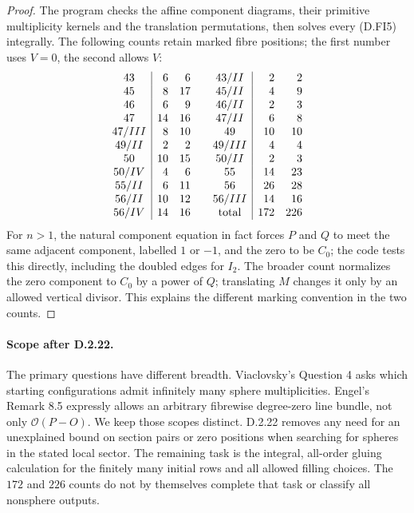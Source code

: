\begin{proof}
The program checks the affine component diagrams, their primitive
multiplicity kernels and the translation permutations, then solves
every (D.FI5) integrally. The following counts retain marked fibre
positions; the first number uses $V=0$, the second allows $V$:
\[
\begin{array}{c|rr@{\qquad}c|rr}
43&6&6&43/II&2&2\\
45&8&17&45/II&4&9\\
46&6&9&46/II&2&3\\
47&14&16&47/II&6&8\\
47/III&8&10&49&10&10\\
49/II&2&2&49/III&4&4\\
50&10&15&50/II&2&3\\
50/IV&4&6&55&14&23\\
55/II&6&11&56&26&28\\
56/II&10&12&56/III&14&16\\
56/IV&14&16&\text{total}&172&226
\end{array}
\]
For $n>1$, the natural component equation in fact forces
$P$ and $Q$ to meet the same adjacent component, labelled $1$ or
$-1$, and the zero to be $C_0$; the code tests this directly,
including the doubled edges for $I_2$. The broader count normalizes
the zero component to $C_0$ by a power of $Q$; translating $M$
changes it only by an allowed vertical divisor. This explains
the different marking convention in the two counts.
\end{proof}

\paragraph{Scope after D.2.22.}
The primary questions have different breadth. Viaclovsky's
Question 4 \cite[Section 1.1]{manViaclovskyLogs26} asks which starting configurations admit infinitely
many sphere multiplicities. Engel's Remark 8.5 \cite{manEngel26} expressly allows
an arbitrary fibrewise degree-zero line bundle, not only
$\mathcal O(P-O)$. We keep those scopes distinct. D.2.22 removes
any need for an unexplained bound on section pairs or zero
positions when searching for spheres in the stated local sector.
The remaining task is the integral, all-order gluing calculation
for the finitely many initial rows and all allowed filling choices.
The $172$ and $226$ counts do not by themselves complete that task
or classify all nonsphere outputs.

